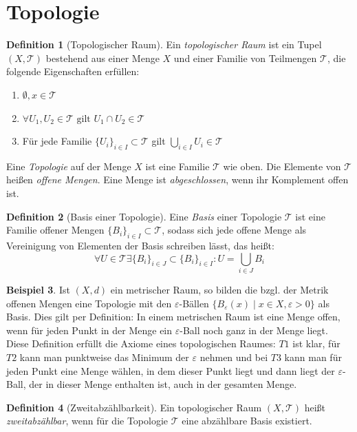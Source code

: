 \documentclass[a4paper]{scrreprt}
\numberwithin{equation}{chapter}
\theoremstyle{definition}
\newtheorem{defn}{Definition}[section]
\newtheorem{bsp}[defn]{Beispiel}
\begin{document}
	\section{Topologie}
		\begin{defn}[Topologischer Raum]
			Ein \emph{topologischer Raum} ist ein Tupel $(X,\mathcal{T})$ bestehend aus einer Menge $X$ und einer Familie von Teilmengen $\mathcal{T}$, die folgende Eigenschaften erfüllen:
			\begin{enumerate}[label=$T$\arabic*]
				\item $\emptyset, x\in \mathcal{T}$
				\item $\forall U_1, U_2\in \mathcal{T} \text{ gilt }U_1\cap U_2\in\mathcal{T}$
				\item Für jede Familie $\lbrace U_i\rbrace_{i\in I}\subset \mathcal{T}$ gilt $\bigcup_{i\in I}U_i\in\mathcal{T}$
			\end{enumerate}
			Eine \emph{Topologie} auf der Menge $X$ ist eine Familie $\mathcal{T}$ wie oben. Die Elemente von $\mathcal{T}$ heißen \emph{offene Mengen}. Eine Menge ist \emph{abgeschlossen}, wenn ihr Komplement offen ist.
		\end{defn}
		\begin{defn}[Basis einer Topologie]
			Eine \emph{Basis} einer Topologie $\mathcal{T}$ ist eine Familie offener Mengen $\lbrace B_i\rbrace_{i\in I}\subset \mathcal{T}$, sodass sich jede offene Menge als Vereinigung von Elementen der Basis schreiben lässt, das heißt:
			\begin{equation*}
				\forall U\in\mathcal{T}\exists \lbrace B_i\rbrace_{i\in J}\subset \lbrace B_i\rbrace_{i\in I}: U=\bigcup_{i\in J}B_i
			\end{equation*}
		\end{defn}
		\begin{bsp}
			Ist $(X,d)$ ein metrischer Raum, so bilden die bzgl. der Metrik offenen Mengen eine Topologie mit den $\varepsilon$-Bällen $\lbrace B_{\varepsilon}(x)\mid x\in X, \varepsilon >0\rbrace$ als Basis. Dies gilt per Definition: In einem metrischen Raum ist eine Menge offen, wenn für jeden Punkt in der Menge ein $\varepsilon$-Ball noch ganz in der Menge liegt. Diese Definition erfüllt die Axiome eines topologischen Raumes: $T1$ ist klar, für $T2$ kann man punktweise das Minimum der $\varepsilon$ nehmen und bei $T3$ kann man für jeden Punkt eine Menge wählen, in dem dieser Punkt liegt und dann liegt der $\varepsilon$-Ball, der in dieser Menge enthalten ist, auch in der gesamten Menge.
		\end{bsp}
		\begin{defn}[Zweitabzählbarkeit]
			Ein topologischer Raum $(X,\mathcal{T})$ heißt \emph{zweitabzählbar}, wenn für die Topologie $\mathcal{T}$ eine abzählbare Basis existiert. 
		\end{defn}
\end{document}
